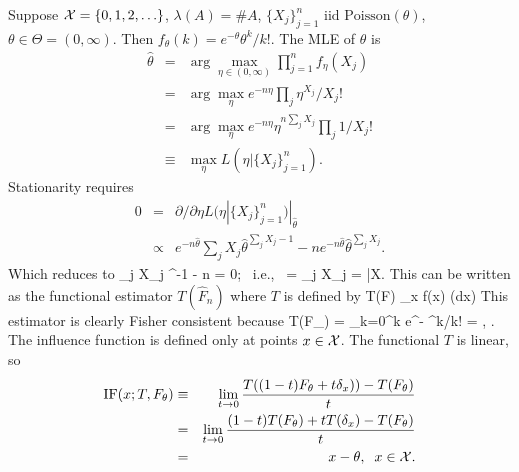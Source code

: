 Suppose ${\cal X} = \{0, 1, 2, \ldots \}$, $\lambda(A) = \#A$,
$\{X_j\}_{j=1}^n \mbox{ iid } \mbox{Poisson}(\theta)$, $\theta \in \Theta = (0, \infty)$.
Then $f_\theta(k) = e^{-\theta} \theta^k/k!$.
The MLE of $\theta$ is
\begin{eqnarray}
   \hat{\theta} &=& \arg \max_{\eta \in (0, \infty)} \prod_{j=1}^n f_\eta(X_j) \nonumber \\
                &=& \arg \max_\eta e^{-n\eta} \prod_j \eta^{X_j}/X_j! \nonumber \\
                &=& \arg \max_\eta e^{-n\eta} \eta^{n\sum_j X_j} \prod_j 1/X_j! \nonumber \\
                & \equiv & \max_\eta L(\eta | \{X_j\}_{j=1}^n).
\end{eqnarray}
Stationarity requires
\begin{eqnarray}
   0 &=& \partial/\partial \eta L(\eta | \{X_j\}_{j=1}^n) |_{\hat{\theta}} \nonumber \\
     &\propto& e^{-n{\hat{\theta}}} \sum_j X_j {\hat{\theta}}^{\sum_j X_j - 1} - n e^{-n{\hat{\theta}}} {\hat{\theta}}^{\sum_j X_j}.
\end{eqnarray}
Which reduces to
\beq
	\sum_j X_j {\hat{\theta}}^{-1} - n = 0; \mbox{ i.e., } \hat{\theta} =  \sum_j X_j = \bar{X}.
\eeq
This can be written as the functional estimator $T(\hat{F}_n)$ where $T$ is defined by
\beq
	T(F) \equiv \int_\calX x f(x) \lambda(dx)
\eeq
This estimator is clearly Fisher consistent because
\beq
	T(F_\theta) = \sum_{k=0}^\infty k e^{-\theta} \theta^k/k! = \theta, \;\; \forall \theta \in \Theta.
\eeq
The influence function is defined only at points $x \in {\cal X}$.
The functional $T$ is linear, so
\begin{eqnarray}
	{\rm IF}(x; T, F_\theta) &\equiv& \lim_{t \rightarrow 0} 
	    \frac{T((1-t)F_\theta + t \delta_x)) - T(F_\theta)}{t} \nonumber \\
	    & = & \lim_{t \rightarrow 0} 
	    \frac{(1-t) T(F_\theta) + t T(\delta_x) - T(F_\theta)}{t} \nonumber \\
	    & = & x - \theta, \;\; x \in {\cal X}.
\end{eqnarray}

